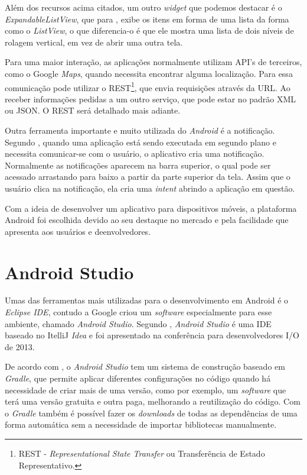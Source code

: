 	\par Além dos recursos acima citados, um outro \textit{widget} que podemos
destacar é o \textit{ExpandableListView}, que para , exibe os
itens em forma de uma lista da forma como o \textit{ListView}, o que
diferencia-o é que ele mostra uma lista de dois níveis de rolagem vertical, em
vez de abrir uma outra tela.
	
	\par Para uma maior interação, as aplicações normalmente utilizam API’s de
terceiros, como o Google \textit{Maps}, quando necessita encontrar alguma
localização. Para  essa comunicação pode utilizar o
REST\footnote{REST - \textit{Representational State Transfer} ou Transferência
de Estado Representativo.}, que envia requisições através da URL. Ao receber
informações pedidas a um outro serviço, que pode estar no padrão XML ou JSON. O
REST será detalhado mais adiante.

	\par Outra ferramenta importante e muito utilizada do \textit{Android} é a
notificação. Segundo , quando uma aplicação está
sendo executada em segundo plano e necessita comunicar-se com o usuário, o
aplicativo cria uma notificação. Normalmente as notificações aparecem na barra
superior, o qual pode ser acessado arrastando para baixo a partir da parte
superior da tela. Assim que o usuário clica na notificação, ela cria uma
\textit{intent} abrindo a aplicação em questão.

	\par Com a ideia de desenvolver um aplicativo para dispositivos móveis, a
plataforma Android foi escolhida devido ao seu destaque no mercado e pela
facilidade que apresenta aos usuários e deenvolvedores.

\section{Android Studio}

	\par Umas das ferramentas mais utilizadas para o desenvolvimento em Android é o
\textit{Eclipse IDE}, contudo a Google criou um \textit{software} especialmente
para esse ambiente, chamado \textit{Android Studio}. Segundo
, \textit{Android Studio} é uma IDE baseado no ItelliJ
\textit{Idea} e foi apresentado na conferência para desenvolvedores I/O de 2013.

	\par De acordo com , o \textit{Android Studio} tem um
sistema de construção baseado em \textit{Gradle}, que permite aplicar
diferentes configurações no código quando há necessidade de criar mais de uma
versão, como por exemplo, um \textit{software} que terá uma versão gratuita e
outra paga, melhorando a reutilização do código. Com o \textit{Gradle} também é
possível fazer os \textit{downloads} de todas as dependências de uma forma
automática sem a necessidade de importar bibliotecas manualmente.

